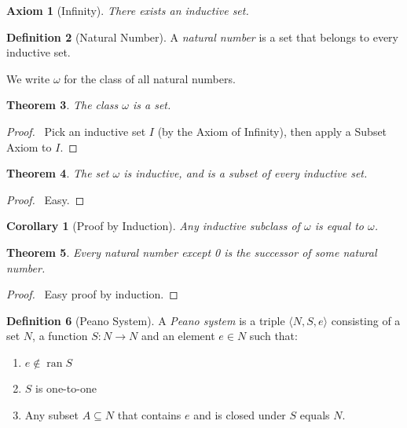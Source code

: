 \documentclass{article}
\let\qed\relax
\newtheorem{axiom}{Axiom}
\newtheorem{theorem}[axiom]{Theorem}
\newtheorem{corollary}{Corollary}[axiom]
\theoremstyle{definition}
\newtheorem{definition}[axiom]{Definition}
\newcommand{\ran}{\ensuremath{\operatorname{ran}}}
\begin{document}
    \begin{axiom}[Infinity]
        There exists an inductive set.
    \end{axiom}

    \begin{definition}[Natural Number]
        A \emph{natural number} is a set that belongs to every inductive set.

        We write $\omega$ for the class of all natural numbers.
    \end{definition}

    \begin{theorem}
        The class $\omega$ is a set.
    \end{theorem}

    \begin{proof}
        \pf\ Pick an inductive set $I$ (by the Axiom of Infinity), then apply a Subset Axiom to $I$. \qed
    \end{proof}

    \begin{theorem}
        The set $\omega$ is inductive, and is a subset of every inductive set.
    \end{theorem}

    \begin{proof}
        \pf\ Easy. \qed
    \end{proof}

    \begin{corollary}[Proof by Induction]
        Any inductive subclass of $\omega$ is equal to $\omega$.
    \end{corollary}

    \begin{theorem}
        Every natural number except 0 is the successor of some natural number.
    \end{theorem}

    \begin{proof}
        \pf\ Easy proof by induction. \qed
    \end{proof}

    \begin{definition}[Peano System]
        A \emph{Peano system} is a triple $\langle N, S, e \rangle$ consisting of a set $N$,
        a function $S : N \rightarrow N$ and an element $e \in N$ such that:
        \begin{enumerate}
            \item $e \notin \ran S$
            \item $S$ is one-to-one
            \item Any subset $A \subseteq N$ that contains $e$ and is closed under $S$ equals $N$.
        \end{enumerate}
    \end{definition}
\end{document}
